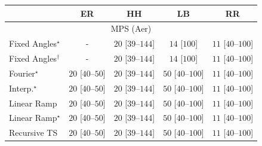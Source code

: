 \begin{tabular}{l|cccc|}
\toprule
            & ER & HH & LB & RR \\
\midrule
\multicolumn{5}{c}{\rule{0pt}{8pt}MPS (Aer)} \\
\midrule
Fixed Angles$^\star$ & {\cellcolor[HTML]{000000}} \color[HTML]{F1F1F1} {\cellcolor{white}} \color{black} - & {\cellcolor[HTML]{E8F6E4}} \color[HTML]{000000} $20$ [$39$--$144$] & {\cellcolor[HTML]{EDF8E9}} \color[HTML]{000000} $14$ [$100$] & {\cellcolor[HTML]{F0F9EC}} \color[HTML]{000000} $11$ [$40$--$100$] \\
Fixed Angles$^\dagger$ & {\cellcolor[HTML]{000000}} \color[HTML]{F1F1F1} {\cellcolor{white}} \color{black} - & {\cellcolor[HTML]{E8F6E4}} \color[HTML]{000000} $20$ [$39$--$144$] & {\cellcolor[HTML]{EDF8E9}} \color[HTML]{000000} $14$ [$100$] & {\cellcolor[HTML]{F0F9EC}} \color[HTML]{000000} $11$ [$40$--$100$] \\
Fourier$^\star$ & {\cellcolor[HTML]{E8F6E4}} \color[HTML]{000000} $20$ [$40$--$50$] & {\cellcolor[HTML]{E8F6E4}} \color[HTML]{000000} $20$ [$39$--$144$] & {\cellcolor[HTML]{C2E7BB}} \color[HTML]{000000} $50$ [$40$--$100$] & {\cellcolor[HTML]{F0F9EC}} \color[HTML]{000000} $11$ [$40$--$100$] \\
Interp.$^\star$ & {\cellcolor[HTML]{E8F6E4}} \color[HTML]{000000} $20$ [$40$--$50$] & {\cellcolor[HTML]{E8F6E4}} \color[HTML]{000000} $20$ [$39$--$144$] & {\cellcolor[HTML]{C2E7BB}} \color[HTML]{000000} $50$ [$40$--$100$] & {\cellcolor[HTML]{F0F9EC}} \color[HTML]{000000} $11$ [$40$--$100$] \\
Linear Ramp & {\cellcolor[HTML]{E8F6E4}} \color[HTML]{000000} $20$ [$40$--$50$] & {\cellcolor[HTML]{E8F6E4}} \color[HTML]{000000} $20$ [$39$--$144$] & {\cellcolor[HTML]{C2E7BB}} \color[HTML]{000000} $50$ [$40$--$100$] & {\cellcolor[HTML]{F0F9EC}} \color[HTML]{000000} $11$ [$40$--$100$] \\
Linear Ramp$^\star$ & {\cellcolor[HTML]{E8F6E4}} \color[HTML]{000000} $20$ [$40$--$50$] & {\cellcolor[HTML]{E8F6E4}} \color[HTML]{000000} $20$ [$39$--$144$] & {\cellcolor[HTML]{C2E7BB}} \color[HTML]{000000} $50$ [$40$--$100$] & {\cellcolor[HTML]{F0F9EC}} \color[HTML]{000000} $11$ [$40$--$100$] \\
Recursive TS & {\cellcolor[HTML]{E8F6E4}} \color[HTML]{000000} $20$ [$40$--$50$] & {\cellcolor[HTML]{E8F6E4}} \color[HTML]{000000} $20$ [$39$--$144$] & {\cellcolor[HTML]{C2E7BB}} \color[HTML]{000000} $50$ [$40$--$100$] & {\cellcolor[HTML]{F0F9EC}} \color[HTML]{000000} $11$ [$40$--$100$] \\

\end{tabular}
